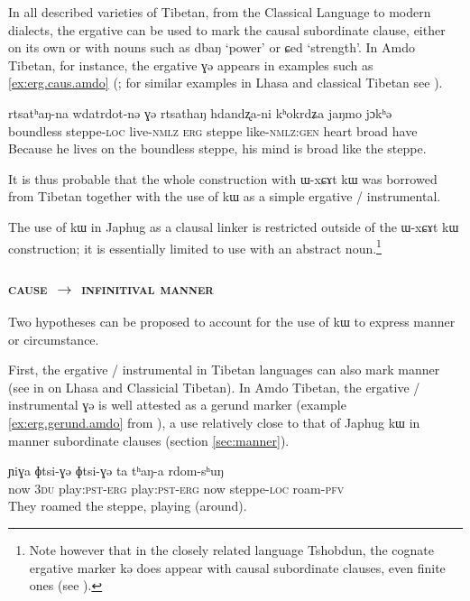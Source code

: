 \documentclass[oldfontcommands,oneside,a4paper,11pt]{article}
\newcommand{\ipa}[1]{{\phon #1}} %
\begin{document}
In all described varieties of Tibetan, from the Classical Language to modern dialects, the ergative can be used to mark the causal subordinate clause, either on its own or with nouns such as \ipa{dbaŋ} `power' or \ipa{ɕed} `strength'. In Amdo Tibetan, for instance, the ergative \ipa{ɣə} appears in examples such as \ref{ex:erg.caus.amdo} (\citealt[271-272]{vbrugmo03maqu}; for similar examples in Lhasa and classical Tibetan see \citealt[129]{tounadre96erg}).
 \begin{exe} 
\ex \label{ex:erg.caus.amdo}
\gll  \ipa{kʰokjaŋwi} 	\ipa{rtsatʰaŋ-na} 	\ipa{wdatrdot-nə} 	\ipa{ɣə} 	\ipa{rtsathaŋ} 	\ipa{hdandʐa-ni} 	\ipa{kʰokrdʑa} 	\ipa{jaŋmo} 	\ipa{jɔkʰə}  \\
boundless steppe-\textsc{loc} live-\textsc{nmlz} \textsc{erg} steppe like-\textsc{nmlz:gen} heart broad have \\
\glt  Because he lives on the boundless steppe, his mind is broad like the steppe.
\end{exe}  
 
It is thus probable that the whole construction with \ipa{ɯ-xɕɤt kɯ} was borrowed from Tibetan together with the use of \ipa{kɯ} as a simple ergative / instrumental.

The use of  \ipa{kɯ} in Japhug as a clausal linker is restricted outside of the  \ipa{ɯ-xɕɤt kɯ} construction; it is essentially limited to use with an abstract noun.\footnote{Note however that in the closely related language Tshobdun, the cognate ergative marker \ipa{kə} does appear with causal subordinate clauses, even finite ones (see \citealt[479]{sun12complementation}).}
 
 \subsubsection{\textsc{cause} $\rightarrow$ \textsc{infinitival manner}}
Two hypotheses can be proposed to account for the  use of  \ipa{kɯ} to express manner or circumstance.

First,   the ergative / instrumental in Tibetan languages can also mark manner (see in  \citealt[128]{tounadre96erg} on Lhasa and Classicial Tibetan). In Amdo Tibetan, the ergative / instrumental \ipa{ɣə} is well attested as a gerund marker (example \ref{ex:erg.gerund.amdo} from \citealt[162; 167]{haller04themchen}), a use relatively close to that of Japhug \ipa{kɯ} in manner subordinate clauses (section \ref{sec:manner}).

 \begin{exe} 
\ex \label{ex:erg.gerund.amdo}
\gll   \ipa{ta} 	\ipa{ɲiɣa} 	\ipa{ɸtsi-ɣə} 	\ipa{ɸtsi-ɣə} 	\ipa{ta} 	\ipa{tʰaŋ-a} 	\ipa{rdom-sʰuŋ}  \\
now \textsc{3du} play:\textsc{pst}-\textsc{erg} play:\textsc{pst}-\textsc{erg} now steppe-\textsc{loc} roam-\textsc{pfv} \\
\glt   They roamed the steppe, playing (around).
\end{exe}  
\end{document}
